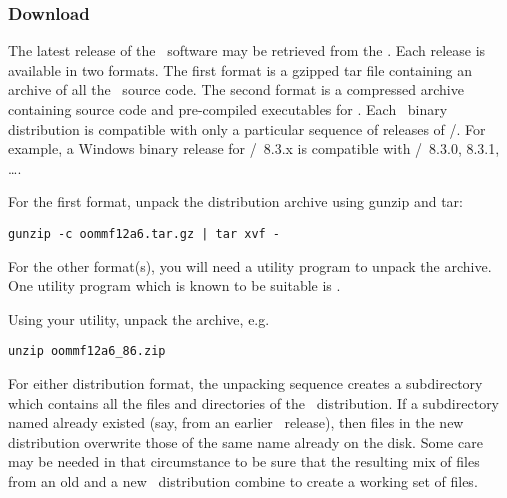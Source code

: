 \subsubsection{Download}

The latest release of the \OOMMF\ software may be retrieved from the
.  Each release is
available in two formats.  The first format is a gzipped tar file
containing an archive of all the \OOMMF\ source code.  The second format
is a  compressed archive containing source code and
pre-compiled executables for \Windows.  Each \Windows\ binary
distribution is compatible with only a particular sequence of releases
of \Tcl/\Tk.  For example, a Windows binary release for \Tcl/\Tk\ 8.3.x
is compatible with \Tcl/\Tk\ 8.3.0, 8.3.1, \ldots.  

For the first format, unpack the distribution archive using gunzip and
tar:
\begin{verbatim}
gunzip -c oommf12a6.tar.gz | tar xvf -
\end{verbatim}

For the other format(s), you will need a utility program to unpack the
 archive.  
One utility program which is known to be suitable is
.

Using your utility, unpack the  archive, e.g.
\begin{verbatim}
unzip oommf12a6_86.zip
\end{verbatim}

For either distribution format, the unpacking sequence creates a
subdirectory  which contains all the files and directories
of the \OOMMF\ distribution.  If a subdirectory named 
already existed (say, from an earlier \OOMMF\ release), then
files in the new distribution overwrite those of the same name already
on the disk.  Some care may be needed in that circumstance to be
sure that the resulting mix of files from an old and a new 
\OOMMF\ distribution combine to create a working set of files.

